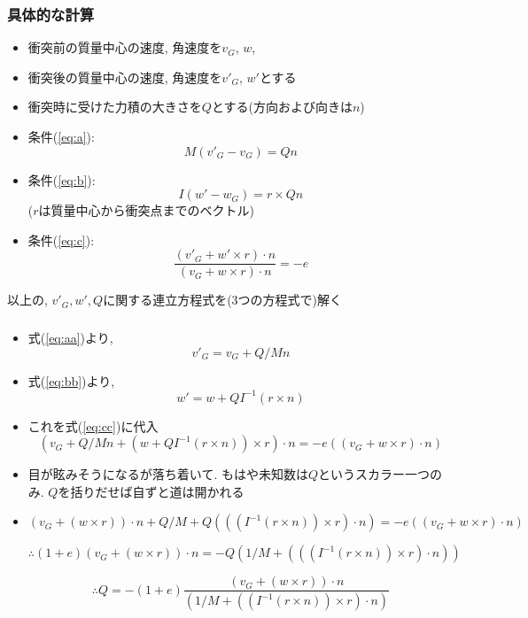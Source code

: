 \documentclass[10pt,dvipdfmx]{beamer}
\begin{document}
\begin{frame}[fragile]
\frametitle{具体的な計算}
\begin{itemize}
\item 衝突前の質量中心の速度, 角速度を$v_G$, $w$,
\item 衝突後の質量中心の速度, 角速度を$v'_G$, $w'$とする
\item 衝突時に受けた力積の大きさを$Q$とする(方向および向きは$n$)
\end{itemize}

\begin{itemize}
\item 条件(\ref{eq:a}):
\begin{equation}
M (v'_G - v_G) = Q n \label{eq:aa}
\end{equation}
\item 条件(\ref{eq:b}):
\begin{equation}
I (w' - w_G) = r \times Q n \label{eq:bb}
\end{equation}
($r$は質量中心から衝突点までのベクトル)
\item 条件(\ref{eq:c}):
\begin{equation}
\frac{(v'_G + w' \times r) \cdot n}{(v_G + w \times r) \cdot n} = -e
\label{eq:cc}
\end{equation}
\end{itemize}
以上の, $v'_G, w', Q$に関する連立方程式を(3つの方程式で)解く
\end{frame}


\begin{frame}[fragile]
\frametitle{}
\begin{itemize}
\item 式(\ref{eq:aa})より,
\[ v'_G = v_G +  Q/M n \]
\item 式(\ref{eq:bb})より,
\[ w' = w + QI^{-1} (r \times n) \]
\item これを式(\ref{eq:cc})に代入
\[ 
(v_G +  Q/M n + (w + QI^{-1} (r \times n)) \times r) \cdot n
= -e ((v_G + w \times r) \cdot n)
\]
\item 目が眩みそうになるが落ち着いて. もはや未知数は$Q$というスカラー一つのみ.
$Q$を括りだせば自ずと道は開かれる
\item []
\[ 
(v_G +(w \times r)) \cdot n +  Q/M + Q (((I^{-1} (r \times n)) \times r) \cdot n)
= -e ((v_G + w \times r) \cdot n)
\]

\[ 
\therefore (1 + e) (v_G +(w \times r)) \cdot n 
= -Q (1/M + (((I^{-1} (r \times n)) \times r) \cdot n))
\]

\[ 
\therefore Q = 
-(1 + e) \frac{(v_G +(w \times r)) \cdot n}{(1/M + ((I^{-1} (r \times n)) \times r) \cdot n)}
\]

\end{itemize}
\end{frame}
\end{document}
